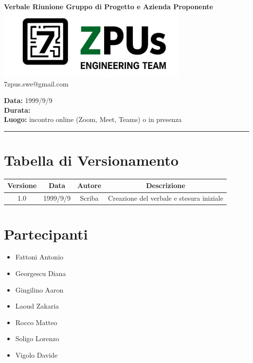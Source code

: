 \documentclass[a4paper,12pt]{article}
\begin{document}
\begin{center}
    \Large \textbf{Verbale Riunione Gruppo di Progetto e Azienda Proponente}\\
    \vspace{0.5cm}
    \includegraphics[width=9.5cm]{../../images/logo7ZPUs2.jpg}
    \label{7zpus.swe@gmail.com}\\
    \small\hspace{10cm} 7zpus.swe@gmail.com
\end{center}


\noindent
\textbf{Data:} 1999/9/9 \\
\textbf{Durata:}  \\
\textbf{Luogo:} incontro online (Zoom, Meet, Teams) o in presenza

\vspace{0.3cm}
\hrule
\vspace{0.5cm}

\tableofcontents

\newpage

\section{Tabella di Versionamento}
    \begin{tabular}{|c|c|c|c|}
        \hline
        \textbf{Versione} & \textbf{Data} & \textbf{Autore} & \textbf{Descrizione} \\
        \hline
        1.0 & 1999/9/9 & Scriba & Creazione del verbale e stesura iniziale \\

        \hline
    \end{tabular}


\section{Partecipanti}
\begin{itemize}[noitemsep]
    \item Fattoni Antonio 
    \item Georgescu Diana
    \item Gingilino Aaron
    \item Laoud Zakaria
    \item Rocco Matteo
    \item Soligo Lorenzo
    \item Vigolo Davide
\end{itemize}
\end{document}
